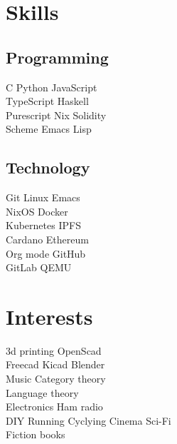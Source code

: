 \documentclass[]{cv}
\begin{document}
\begin{minipage}[t]{0.24\textwidth}



\section{Skills}
\subsection{Programming}
\textbullet{} C
\textbullet{} Python
\textbullet{} JavaScript \\
\textbullet{} TypeScript
\textbullet{} Haskell \\
\textbullet{} Purescript
\textbullet{} Nix
\textbullet{} Solidity \\
\textbullet{} Scheme
\textbullet{} Emacs Lisp
\sectionsep

\subsection{Technology}
\textbullet{} Git
\textbullet{} Linux
\textbullet{} Emacs \\
\textbullet{} NixOS
\textbullet{} Docker \\
\textbullet{} Kubernetes
\textbullet{} IPFS \\
\textbullet{} Cardano
\textbullet{} Ethereum \\
\textbullet{} Org mode
\textbullet{} GitHub \\
\textbullet{} GitLab
\textbullet{} QEMU
\sectionsep

\section{Interests}
\textbullet{} 3d printing
\textbullet{} OpenScad \\
\textbullet{} Freecad
\textbullet{} Kicad
\textbullet{} Blender \\
\textbullet{} Music
\textbullet{} Category theory \\
\textbullet{} Language theory \\
\textbullet{} Electronics
\textbullet{} Ham radio \\
\textbullet{} DIY
\textbullet{} Running
\textbullet{} Cyclying
\textbullet{} Cinema
\textbullet{} Sci-Fi \\
\textbullet{} Fiction books

\sectionsep



\end{minipage}
\end{document}
